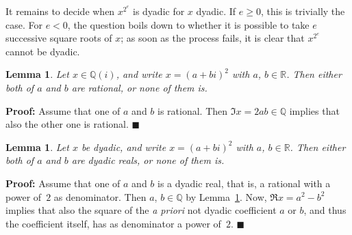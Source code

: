 \documentclass [11pt]{article}
\newcommand {\Q}{\mathbb Q}
\newcommand {\R}{\mathbb R}
\renewcommand {\geq}{\geqslant}
\newtheorem{lemma}[theorem]{Lemma}
\newenvironment{proof}{\noindent \textbf {Proof:}}{{\hspace* {\fill}$\blacksquare$}}
\begin{document}
It remains to decide when $x^{2^e}$ is dyadic for $x$ dyadic. If $e \geq 0$,
this is trivially the case. For $e < 0$, the question boils down to whether
it is possible to take $e$ successive square roots of $x$; as soon as the
process fails, it is clear that $x^{2^e}$ cannot be dyadic.

\begin{lemma}
\label {lm:sqrtrat}
Let $x \in \Q (i)$, and write $x = (a + b i)^2$ with $a$, $b \in \R$.
Then either both of $a$ and $b$ are rational, or none of them is.
\end{lemma}

\begin{proof}
Assume that one of $a$ and $b$ is rational. Then $\Im x = 2 a b \in \Q$
implies that also the other one is rational.
\end{proof}

\begin{lemma}
Let $x$ be dyadic, and write $x = (a + b i)^2$ with $a$, $b \in \R$.
Then either both of $a$ and $b$ are dyadic reals, or none of them is.
\end{lemma}

\begin{proof}
Assume that one of $a$ and $b$ is a dyadic real, that is, a rational with
a power of~$2$ as denominator. Then $a$, $b \in \Q$ by Lemma~\ref {lm:sqrtrat}.
Now, $\Re x = a^2 - b^2$ implies that also the square of the \textit {a priori}
not dyadic coefficient $a$ or $b$, and thus the coefficient itself,
has as denominator a power of~$2$.
\end{proof}
\end{document}
